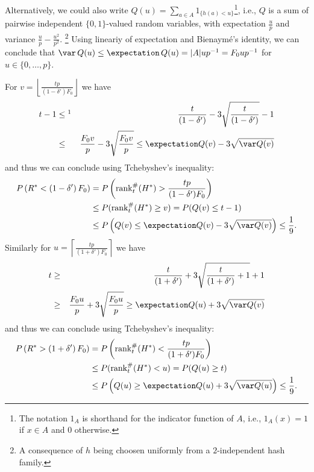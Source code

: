 \documentclass[11pt,a4paper]{article}
\begin{document}
Alternatively, we could also write $Q(u) = \sum_{a \in A} 1_{\{h(a) < u\}}$\footnote{The notation $1_A$ is shorthand for the indicator function of $A$, i.e., $1_A(x)=1$ if $x \in A$ and $0$ otherwise.}, i.e., $Q$ is a sum of pairwise independent $\{0,1\}$-valued random variables, with expectation $\frac{u}{p}$ and variance $\frac{u}{p} - \frac{u^2}{p^2}$.
\footnote{A consequence of $h$ being choosen uniformly from a $2$-independent hash family.}
Using lineariy of expectation and Bienaym\'e's identity, we can conclude that $\var \, Q(u) \leq \expectation \, Q(u) = |A|u p^{-1} = F_0 u p^{-1}$ for $u \in \{0,\ldots,p\}$.

For $v = \left\lfloor \frac{tp}{(1-\delta') F_0} \right\rfloor$ we have
\begin{eqnarray*}
    t-1 & \leq\footnotemark & \frac{t}{(1-\delta')} - 3\sqrt{\frac{t}{(1-\delta')}} - 1 \\
     &\leq&  \frac{F_0 v}{p} - 3 \sqrt{\frac{F_0 v}{p}} \leq \expectation Q(v) - 3 \sqrt{\var Q(v)}
\end{eqnarray*}
and thus we can conclude using Tchebyshev's inequality:
\begin{align}
    P\left(R^* < \left(1-\delta'\right) F_0\right) & = P\left(\mathrm{rank}_t^{\#}(H^*) > \frac{tp}{(1-\delta')F_0}\right) \nonumber \\ 
    & \leq P(\mathrm{rank}_t^{\#}(H^*) \geq v) = P(Q(v) \leq t-1) \label{eq:r_star_upper_bound} \\
    & \leq P\left(Q(v) \leq \expectation Q(v) - 3 \sqrt{\var Q(v)}\right) \leq \frac{1}{9} \textrm{.} \nonumber
\end{align}
Similarly for $u = \left\lceil \frac{tp}{(1+\delta') F_0} \right\rceil$ we have
\begin{eqnarray*}
    t & \geq & \frac{t}{(1+\delta')} + 3\sqrt{\frac{t}{(1+\delta')}+1} + 1 \\
     &\geq&  \frac{F_0 u}{p} + 3 \sqrt{\frac{F_0 u}{p}} \geq \expectation Q(u) + 3 \sqrt{\var Q(v)}
\end{eqnarray*}
and thus we can conclude using Tchebyshev's inequality:
\begin{align}
    P\left(R^* > \left(1+\delta'\right) F_0\right) & = P\left(\mathrm{rank}_t^{\#}(H^*) < \frac{tp}{(1+\delta')F_0}\right) \nonumber \\ 
    & \leq P(\mathrm{rank}_t^{\#}(H^*) < u) = P(Q(u) \geq t) \label{eq:r_star_lower_bound} \\
    & \leq P\left(Q(u) \geq \expectation Q(u) + 3 \sqrt{\var Q(u)}\right) \leq \frac{1}{9} \textrm{.} \nonumber
\end{align}
\end{document}
